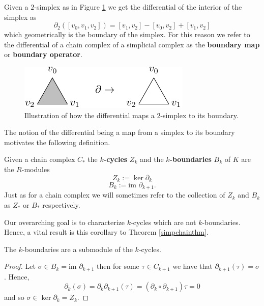 \begin{example}
Given a $2$-simplex as in Figure \ref{2simplex} we get the differential of the interior of the simplex as \[\partial_{2}([v_{0},v_{1},v_{2}])=[v_{1},v_{2}]-[v_{0},v_{2}]+[v_{1},v_{2}]\] which geometrically is the boundary of the simplex. For this reason we refer to the differential of a chain complex of a simplicial complex as the \textbf{boundary map} or \textbf{boundary operator}.
\begin{figure}[ht]
  \centering
  \includegraphics[scale=2]{partialtri.pdf}
  \caption{\label{2simplex} Illustration of how the differential maps a $2$-simplex to its boundary.}
\end{figure}
\end{example}
The notion of the differential being a map from a simplex to its boundary motivates the following definition.
\begin{definition}
  Given a chain complex $C_{*}$ the \textbf{$k$-cycles} $Z_{k}$  and the \textbf{$k$-boundaries} $B_{k}$ of $K$ are the $R$-modules
  \[ Z_{k} := \ker \partial_{k}\]
  \[ B_{k} := \textrm{im } \partial_{k+1}.\]
  Just as for a chain complex we will sometimes refer to the collection of $Z_{k}$ and $B_{k}$ as $Z_{*}$ or $B_{*}$ respectively.
\end{definition}
Our overarching goal is to characterize $k$-cycles which are not $k$-boundaries. Hence, a vital result is this corollary to Theorem \ref{simpchainthm}.

\begin{corollary}
  The $k$-boundaries are a submodule of the $k$-cycles.
\end{corollary}


\begin{proof}
Let $\sigma \in B_{k} = \textrm{im } \partial_{k+1}$ then for some $\tau \in C_{k+1}$ we have that $\partial_{k+1}(\tau)=\sigma$. Hence,
\[ \partial_{k}(\sigma) = \partial_{k} \partial_{k+1}(\tau) = (\partial_{k} \circ \partial_{k+1}) \tau = 0\]
and so $\sigma \in \ker \partial_{k} = Z_{k}$.
\end{proof}

